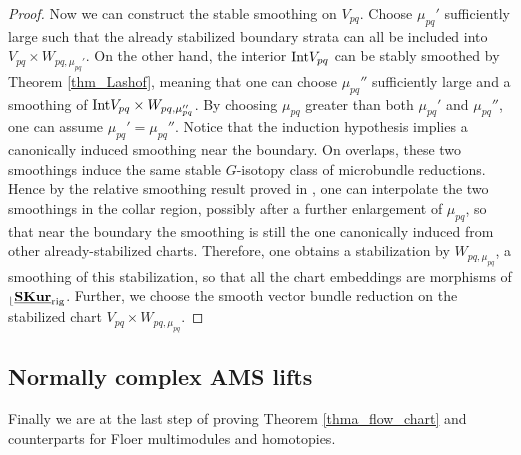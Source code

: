 \documentclass[reqno, 10pt]{amsart}
\numberwithin{equation}{section}
\numberwithin{equation}{section}
\theoremstyle{definition}
\theoremstyle{remark}
\renewcommand{\outer}{{}_{\lfloor}}
\newcommand{\uds}[1]{\underline{\smash{#1}}}
\begin{document}
\begin{proof}
Now we can construct the stable smoothing on $V_{pq}$. Choose $\mu_{pq}'$ sufficiently large such that the already stabilized boundary strata can all be included into $V_{pq} \times W_{pq, \mu_{pq}'}$. On the other hand, the interior ${\rm Int} V_{pq}$ can be stably smoothed by Theorem \ref{thm_Lashof}, meaning that one can choose $\mu_{pq}''$ sufficiently large and a smoothing of ${\rm Int} V_{pq} \times W_{pq, \mu_{pq}''}$. By choosing $\mu_{pq}$ greater than both $\mu_{pq}'$ and $\mu_{pq}''$, one can assume $\mu_{pq}' = \mu_{pq}''$. Notice that the induction hypothesis implies a canonically induced smoothing near the boundary. On overlaps, these two smoothings induce the same stable $G$-isotopy class of microbundle reductions. Hence by the relative smoothing result proved in \cite[Appendix B]{Bai_Xu_Arnold}, one can interpolate the two smoothings in the collar region, possibly after a further enlargement of $\mu_{pq}$, so that near the boundary the smoothing is still the one canonically induced from other already-stabilized charts. Therefore, one obtains a stabilization by $W_{pq, \mu_{pq}}$, a smoothing of this stabilization, so that all the chart embeddings are morphisms of $\outer \uds{\bf SKur}_{\rm rig}$. Further, we choose the smooth vector bundle reduction on the stabilized chart $V_{pq}  \times W_{pq, \mu_{pq}}$. 
\end{proof}











\subsection{Normally complex AMS lifts}

Finally we are at the last step of proving Theorem \ref{thma_flow_chart} and counterparts for Floer multimodules and homotopies. 
\end{document}
